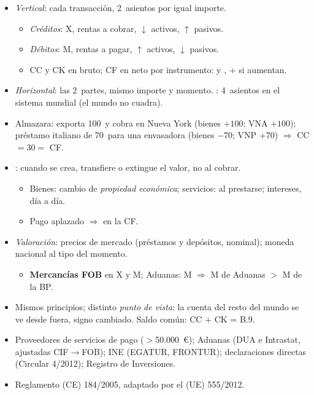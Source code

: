 \documentclass{article}
\begin{document}
\begin{columnas}
\begin{itemize}
\item \emph{Vertical}: cada transacción, 2~asientos por igual importe.
  \begin{itemize}
  \item \emph{Créditos}: X, rentas a cobrar, $\downarrow$ activos, $\uparrow$ pasivos.
  \item \emph{Débitos}: M, rentas a pagar, $\uparrow$ activos, $\downarrow$ pasivos.
  \item CC y CK en bruto; CF en neto por instrumento:  y , $+$ si aumentan.
  \end{itemize}
\item \emph{Horizontal}: las 2~partes, mismo importe y momento. : 4~asientos en el sistema mundial (el mundo no cuadra).
\item Almazara: exporta 100~y cobra en Nueva York (bienes $+100$; VNA $+100$); préstamo italiano de 70~para una envasadora (bienes $-70$; VNP $+70$) $\Rightarrow$ CC $=30=$ CF.
\end{itemize}
\begin{itemize}
\item {}: cuando se crea, transfiere o extingue el valor, no al cobrar.
  \begin{itemize}
  \item Bienes: cambio de \emph{propiedad económica}; servicios: al prestarse; intereses, día a día.
  \item Pago aplazado $\Rightarrow$  en la CF.
  \end{itemize}
\item \emph{Valoración}: precios de mercado (préstamos y depósitos, nominal); moneda nacional al tipo del momento.
  \begin{itemize}
  \item \textbf{Mercancías FOB} en X y M; Aduanas: M  $\Rightarrow$ M de Aduanas $>$ M de la BP.
  \end{itemize}
\end{itemize}
\begin{itemize}
\item Mismos principios; distinto \emph{punto de vista}: la cuenta del resto del mundo se ve desde fuera, signo cambiado. Saldo común: CC $+$ CK = B.9.
\end{itemize}
\begin{itemize}
\item Proveedores de servicios de pago ($>$50.000~€); Aduanas (DUA e Intrastat, ajustadas CIF$\to$FOB); INE (EGATUR, FRONTUR); declaraciones directas (Circular 4/2012); Registro de Inversiones.
\item Reglamento (CE) 184/2005, adaptado por el (UE) 555/2012.
\end{itemize}


\end{columnas}
\end{document}
